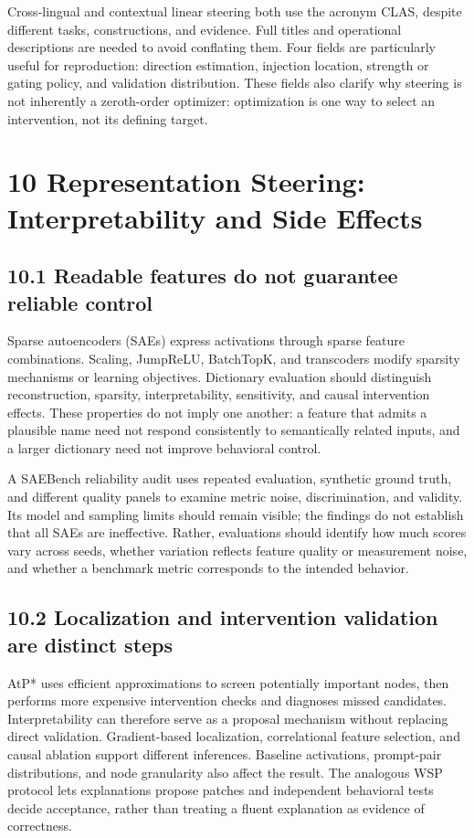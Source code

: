 Cross-lingual and contextual linear steering both use the acronym CLAS, despite different tasks, constructions, and evidence.\cite{r117,r122} Full titles and operational descriptions are needed to avoid conflating them. Four fields are particularly useful for reproduction: direction estimation, injection location, strength or gating policy, and validation distribution.\cite{r86,r107} These fields also clarify why steering is not inherently a zeroth-order optimizer: optimization is one way to select an intervention, not its defining target.


\section*{10 Representation Steering: Interpretability and Side Effects}

\subsection*{10.1 Readable features do not guarantee reliable control}

Sparse autoencoders (SAEs) express activations through sparse feature combinations. Scaling, JumpReLU, BatchTopK, and transcoders modify sparsity mechanisms or learning objectives.\cite{r92,r100,r101,r105,r106} Dictionary evaluation should distinguish reconstruction, sparsity, interpretability, sensitivity, and causal intervention effects. These properties do not imply one another: a feature that admits a plausible name need not respond consistently to semantically related inputs, and a larger dictionary need not improve behavioral control.\cite{r112,r125}


A SAEBench reliability audit uses repeated evaluation, synthetic ground truth, and different quality panels to examine metric noise, discrimination, and validity.\cite{r124} Its model and sampling limits should remain visible; the findings do not establish that all SAEs are ineffective. Rather, evaluations should identify how much scores vary across seeds, whether variation reflects feature quality or measurement noise, and whether a benchmark metric corresponds to the intended behavior.


\subsection*{10.2 Localization and intervention validation are distinct steps}

AtP* uses efficient approximations to screen potentially important nodes, then performs more expensive intervention checks and diagnoses missed candidates.\cite{r97} Interpretability can therefore serve as a proposal mechanism without replacing direct validation. Gradient-based localization, correlational feature selection, and causal ablation support different inferences. Baseline activations, prompt-pair distributions, and node granularity also affect the result. The analogous WSP protocol lets explanations propose patches and independent behavioral tests decide acceptance, rather than treating a fluent explanation as evidence of correctness.\cite{r116}


